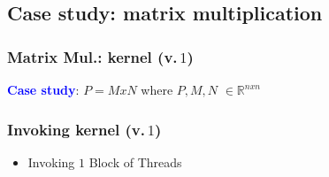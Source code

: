 \subsection{Case study: matrix multiplication}
\begin{frame}
	\frametitle{Matrix Mul.: kernel (v.\,$1$)}
	\textbf{\textcolor{blue}{Case study}}: $P=MxN$ where $P,M,N$ $\in \mathbb{R}^{nxn}$
	
\end{frame}

\begin{frame}
	\frametitle{Invoking kernel (v.\,$1$)}
	\begin{itemize}
		\item Invoking $1$ Block of Threads
        
        \end{itemize}			 
\end{frame}

